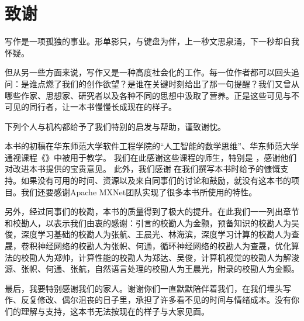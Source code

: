\chapter*{ 致谢}
写作是一项孤独的事业。形单影只，与键盘为伴，上一秒文思泉涌，下一秒却自我怀疑。

但从另一些方面来说，写作又是一种高度社会化的工作。每一位作者都可以回头追问：是谁点燃了我们的创作欲望？是谁在关键时刻给出了那一句提醒？我们又曾从哪些作家、思想家、研究者以及各种不同的思想中汲取了营养。正是这些可见与不可见的同行者，让一本书慢慢长成现在的样子。

下列个人与机构都给予了我们特别的启发与帮助，谨致谢忱。
 
本书的初稿在华东师范大学软件工程学院的“人工智能的数学思维”、华东师范大学通视课程《》中被用于教学。
我们在此感谢这些课程的师生，特别是  ，感谢他们对改进本书提供的宝贵意见。
此外，我们感谢
在我们撰写本书时给予的慷慨支持。如果没有可用的时间、资源以及来自同事们的讨论和鼓励，就没有这本书的项目。我们还要感谢Apache MXNet团队实现了很多本书所使用的特性。

另外，经过同事们的校勘，本书的质量得到了极大的提升。在此我们一一列出章节和校勘人，以表示我们由衷的感谢：引言的校勘人为金颢，预备知识的校勘人为吴俊，深度学习基础的校勘人为张航、王晨光、林海滨，深度学习计算的校勘人为查晟，卷积神经网络的校勘人为张帜、何通，循环神经网络的校勘人为查晟，优化算法的校勘人为郑帅，计算性能的校勘人为郑达、吴俊，计算机视觉的校勘人为解浚源、张帜、何通、张航，自然语言处理的校勘人为王晨光，附录的校勘人为金颢。
%
%

最后，我要特别感谢我们的家人。谢谢你们一直默默陪伴着我们，在我们埋头写作、反复修改、偶尔沮丧的日子里，承担了许多看不见的时间与情绪成本。没有你们的理解与支持，这本书无法按现在的样子与大家见面。
